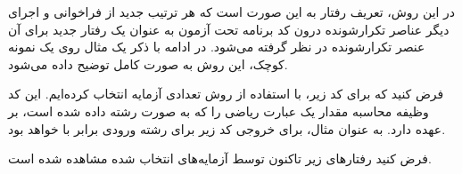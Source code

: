 در این روش، تعریف رفتار به این صورت است که هر ترتیب جدید از فراخوانی و اجرای دیگر عناصر تکرارشونده درون کد برنامه تحت آزمون به عنوان یک رفتار جدید برای آن عنصر تکرارشونده در نظر گرفته می‌شود. در ادامه با ذکر یک مثال روی یک نمونه کوچک، این روش به صورت کامل توضیح داده می‌شود.

فرض کنید که برای کد زیر، با استفاده از روش  تعدادی آزمایه انتخاب کرده‌ایم. این کد وظیفه محاسبه مقدار یک عبارت ریاضی را که به صورت رشته داده شده است، بر عهده دارد. به عنوان مثال،‌ برای خروجی کد زیر برای رشته ورودی  برابر با  خواهد بود.

\newpage
\begin{figure}[!h]
	\begin{LTR}
		\singlespacing
		
	\end{LTR}
\end{figure}

فرض کنید رفتارهای زیر تاکنون توسط آزمایه‌های انتخاب شده مشاهده شده است.

